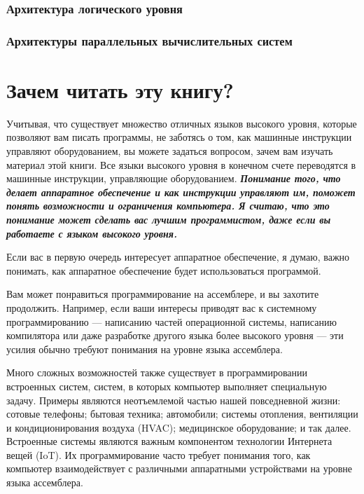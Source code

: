 \subsubsection*{Архитектура логического уровня}

\subsubsection*{Архитектуры параллельных вычислительных систем}

\section*{Зачем читать эту книгу?}

Учитывая, что существует множество отличных языков высокого уровня, которые позволяют вам писать программы, не заботясь о том, как машинные инструкции управляют оборудованием, вы можете задаться вопросом, зачем вам изучать материал этой книги. Все языки высокого уровня в конечном счете переводятся в машинные инструкции, управляющие оборудованием. \textbf{\textit{Понимание того, что делает аппаратное обеспечение и как инструкции управляют им, поможет понять возможности и ограничения компьютера. Я считаю, что это понимание может сделать вас лучшим программистом, даже если вы работаете с языком высокого уровня.}}

Если вас в первую очередь интересует аппаратное обеспечение, я думаю, важно понимать, как аппаратное обеспечение будет использоваться программой.

Вам может понравиться программирование на ассемблере, и вы захотите продолжить. Например, если ваши интересы приводят вас к системному программированию — написанию частей операционной системы, написанию компилятора или даже разработке другого языка более высокого уровня — эти усилия обычно требуют понимания на уровне языка ассемблера.

Много сложных возможностей также существует в программировании встроенных систем, систем, в которых компьютер выполняет специальную задачу. Примеры являются неотъемлемой частью нашей повседневной жизни: сотовые телефоны; бытовая техника; автомобили; системы отопления, вентиляции и кондиционирования воздуха (HVAC); медицинское оборудование; и так далее. Встроенные системы являются важным компонентом технологии Интернета вещей (IoT). Их программирование часто требует понимания того, как компьютер взаимодействует с различными аппаратными устройствами на уровне языка ассемблера.
